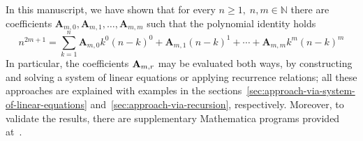 In this manuscript, we have shown that for every $n\geq 1, \; n,m\in\mathbb{N}$
there are coefficients $\mathbf{A}_{m,0}, \mathbf{A}_{m,1}, \ldots, \mathbf{A}_{m,m}$ such that
the polynomial identity holds
\[
    n^{2m+1} = \sum_{k=1}^{n} \mathbf{A}_{m,0} k^0 (n-k)^0 + \mathbf{A}_{m,1}(n-k)^1
    + \cdots + \mathbf{A}_{m,m} k^m (n-k)^m
\]
In particular, the coefficients ${\mathbf{A}} \sb{m,r}$ may be evaluated both ways,
by constructing and solving a system of linear equations or applying recurrence relations;
all these approaches are explained with examples
in the sections~\ref{sec:approach-via-system-of-linear-equations} and~\ref{sec:approach-via-recursion},
respectively.
Moreover, to validate the results, there are supplementary Mathematica programs provided at~\cite{kolosov2023github}.